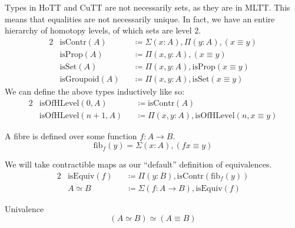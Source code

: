 \begin{romdefinition} \label{homotopy-types}
  Types in HoTT and CuTT are not necessarily sets, as they are in MLTT.
  This means that equalities are not necessarily unique.
  In fact, we have an entire hierarchy of homotopy levels, of which sets are
  level 2.
  \begin{alignat}{2}
    &\text{isContr}(A)    &&\coloneqq \Sigma(x : A) , \Pi(y : A) , (x \equiv y) \\
    &\text{isProp}(A)     &&\coloneqq \Pi(x, y : A) , (x \equiv y) \\
    &\text{isSet}(A)      &&\coloneqq \Pi(x, y : A) , \text{isProp}(x \equiv y) \\
    &\text{isGroupoid}(A) &&\coloneqq \Pi(x, y : A) , \text{isSet}(x \equiv y)
  \end{alignat}
  We can define the above types inductively like so:
  \begin{alignat}{2}
    &\text{isOfHLevel}(0 , A)   &&\coloneqq \text{isContr}(A) \\
    &\text{isOfHLevel}(n+1 , A) &&\coloneqq \Pi(x , y : A) , \text{isOfHLevel}(n , x \equiv y)
  \end{alignat}
\end{romdefinition}
\begin{romdefinition}[Fibers] \label{fibres}
  A fibre is defined over some function \(f : A \rightarrow B\).
  \begin{equation}
    \text{fib}_f(y) = \Sigma(x : A) , (f x \equiv y)
  \end{equation}
\end{romdefinition}
\begin{romdefinition}[Equivalences] \label{equivalences}
  We will take contractible maps \cite[definition 4.4.1]{hottbook} as our
  ``default'' definition of equivalences.
  \begin{alignat}{2}
    &\text{isEquiv}(f) &&\coloneqq \Pi(y : B) , \text{isContr}(\text{fib}_f(y)) \label{is-equiv-def} \\
    &A \simeq B        &&\coloneqq \Sigma(f : A \rightarrow B) , \text{isEquiv}(f)
  \end{alignat}
\end{romdefinition}
\begin{romlemma}
  Univalence
  \begin{equation}
    (A \simeq B) \simeq (A \equiv B)
  \end{equation}
\end{romlemma}
